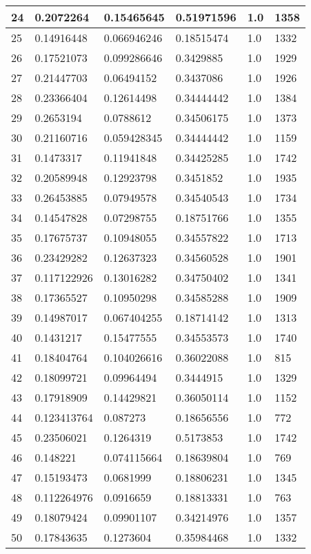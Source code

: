 \begin{longtable}{|l|l|l|l|l|l|}
24 & 0.2072264 & 0.15465645 & 0.51971596 & 1.0 & 1358 \\ \hline 
25 & 0.14916448 & 0.066946246 & 0.18515474 & 1.0 & 1332 \\ \hline 
26 & 0.17521073 & 0.099286646 & 0.3429885 & 1.0 & 1929 \\ \hline 
27 & 0.21447703 & 0.06494152 & 0.3437086 & 1.0 & 1926 \\ \hline 
28 & 0.23366404 & 0.12614498 & 0.34444442 & 1.0 & 1384 \\ \hline 
29 & 0.2653194 & 0.0788612 & 0.34506175 & 1.0 & 1373 \\ \hline 
30 & 0.21160716 & 0.059428345 & 0.34444442 & 1.0 & 1159 \\ \hline 
31 & 0.1473317 & 0.11941848 & 0.34425285 & 1.0 & 1742 \\ \hline 
32 & 0.20589948 & 0.12923798 & 0.3451852 & 1.0 & 1935 \\ \hline 
33 & 0.26453885 & 0.07949578 & 0.34540543 & 1.0 & 1734 \\ \hline 
34 & 0.14547828 & 0.07298755 & 0.18751766 & 1.0 & 1355 \\ \hline 
35 & 0.17675737 & 0.10948055 & 0.34557822 & 1.0 & 1713 \\ \hline 
36 & 0.23429282 & 0.12637323 & 0.34560528 & 1.0 & 1901 \\ \hline 
37 & 0.117122926 & 0.13016282 & 0.34750402 & 1.0 & 1341 \\ \hline 
38 & 0.17365527 & 0.10950298 & 0.34585288 & 1.0 & 1909 \\ \hline 
39 & 0.14987017 & 0.067404255 & 0.18714142 & 1.0 & 1313 \\ \hline 
40 & 0.1431217 & 0.15477555 & 0.34553573 & 1.0 & 1740 \\ \hline 
41 & 0.18404764 & 0.104026616 & 0.36022088 & 1.0 & 815 \\ \hline 
42 & 0.18099721 & 0.09964494 & 0.3444915 & 1.0 & 1329 \\ \hline 
43 & 0.17918909 & 0.14429821 & 0.36050114 & 1.0 & 1152 \\ \hline 
44 & 0.123413764 & 0.087273 & 0.18656556 & 1.0 & 772 \\ \hline 
45 & 0.23506021 & 0.1264319 & 0.5173853 & 1.0 & 1742 \\ \hline 
46 & 0.148221 & 0.074115664 & 0.18639804 & 1.0 & 769 \\ \hline 
47 & 0.15193473 & 0.0681999 & 0.18806231 & 1.0 & 1345 \\ \hline 
48 & 0.112264976 & 0.0916659 & 0.18813331 & 1.0 & 763 \\ \hline 
49 & 0.18079424 & 0.09901107 & 0.34214976 & 1.0 & 1357 \\ \hline 
50 & 0.17843635 & 0.1273604 & 0.35984468 & 1.0 & 1332 \\ \hline 
\end{longtable}